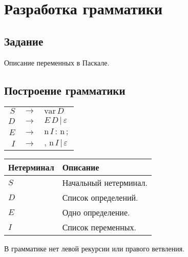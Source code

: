 \section{Разработка грамматики}

\subsection{Задание}
Описание переменных в Паскале.

\subsection{Построение грамматики}
\begin{tabular}{ r c l }
    $S$ & $\to$ & $\mathrm{var}\, D$ \\
    $D$ & $\to$ & $E\, D\, |\, \varepsilon$ \\
    $E$ & $\to$ & $\mathrm{n}\, I\, \mathrm{:\, n\, ;}$ \\
    $I$ & $\to$ & $\mathrm{,\, n}\, I\, |\, \varepsilon$ \\
\end{tabular}

\begin{center}
    \begin{tabular}{ | l | l | }
        \hline
        \textbf{Нетерминал} & \textbf{Описание} \\
        \hline
        $S$ & Начальный нетерминал. \\
        \hline
        $D$ & Список определений. \\
        \hline
        $E$ & Одно определение. \\
        \hline
        $I$ & Список переменных. \\
        \hline
    \end{tabular}
\end{center}

В грамматике нет левой рекурсии или правого ветвления. 

